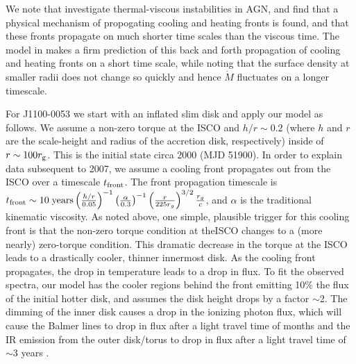 \documentclass[a4paper,fleqn,usenatbib]{mnras}
\begin{document}
We note that \citet{Hameury2009} investigate thermal-viscous
instabilities in AGN, and find that a physical mechanism of
propogating cooling and heating fronts is found, and that these fronts
propagate on much shorter time scales than the viscous time.  The
model in \citet{Hameury2009} makes a firm prediction of this back and
forth propagation of cooling and heating fronts on a short time scale,
while noting that the surface density at smaller radii does not change
so quickly and hence $\dot{M}$ fluctuates on a longer timescale.

For J1100-0053 we start with an inflated slim disk and apply our model
as follows. We assume a non-zero torque at the ISCO and $h/r\sim0.2$
(where $h$ and $r$ are the scale-height and radius of the accretion
disk, respectively) inside of $r\sim100 r_{\rm g}$. This is the
initial state circa 2000 (MJD 51900). In order to explain data
subsequent to 2007, we assume a cooling front propagates out from the
ISCO over a timescale $t_{\rm front}$. The front propagation timescale
is $ t_{\rm front} \sim 10 \; {\rm years}
\left(\frac{h/r}{0.05}\right)^{-1}
\left(\frac{\alpha}{0.3}\right)^{-1}
\left(\frac{r}{225r_{g}}\right)^{3/2} \frac{r_{g}}{c}$, and $\alpha$
is the traditional kinematic viscosity. As noted above, one simple,
plausible trigger for this cooling front is that the non-zero torque
condition at theISCO changes to a (more nearly) zero-torque
condition. This dramatic decrease in the torque at the ISCO leads to a
drastically cooler, thinner innermost disk. As the cooling front
propagates, the drop in temperature leads to a drop in flux. To fit
the observed spectra, our model has the cooler regions behind the
front emitting 10\% the flux of the initial hotter disk, and assumes
the disk height drops by a factor $\sim$2. The dimming of the inner
disk causes a drop in the ionizing photon flux, which will cause the
Balmer lines to drop in flux after a light travel time of months and
the IR emission from the outer disk/torus to drop in flux after a
light travel time of $\sim$3 years \citep{Sirko_Goodman2003,
Koshida2014, Jun2015}.
\end{document}
